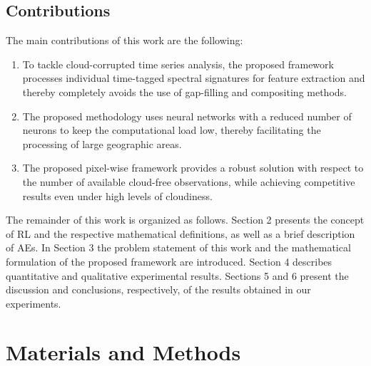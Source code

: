 \documentclass[journal,article,submit,pdftex,moreauthors]{Definitions/mdpi}
\providecommand{\DIFdelend}{} %
\begin{document}

\DIFdelend \subsection{Contributions}
The main contributions of this work are the following:
\begin{enumerate}
	\item To tackle cloud-corrupted time series analysis, the proposed framework processes individual time-tagged spectral signatures for feature extraction and thereby completely avoids the use of gap-filling and compositing methods.
	\item The proposed methodology uses neural networks with a reduced number of neurons to keep the computational load low, thereby facilitating the processing of large geographic areas.
	\item The proposed pixel-wise framework provides a robust solution with respect to the number of available cloud-free observations, while achieving competitive results even under high levels of cloudiness.
\end{enumerate}

The remainder of this work is organized as follows. Section 2 presents the concept of RL and the respective mathematical definitions, as well as a brief description of AEs. 
In Section 3 the problem statement of this work and the mathematical formulation of the proposed framework are introduced. 
Section 4 describes quantitative and qualitative experimental results. 
Sections 5 and 6 present the discussion and conclusions, respectively, of the results obtained in our experiments.

\section{Materials and Methods}
\end{document}
